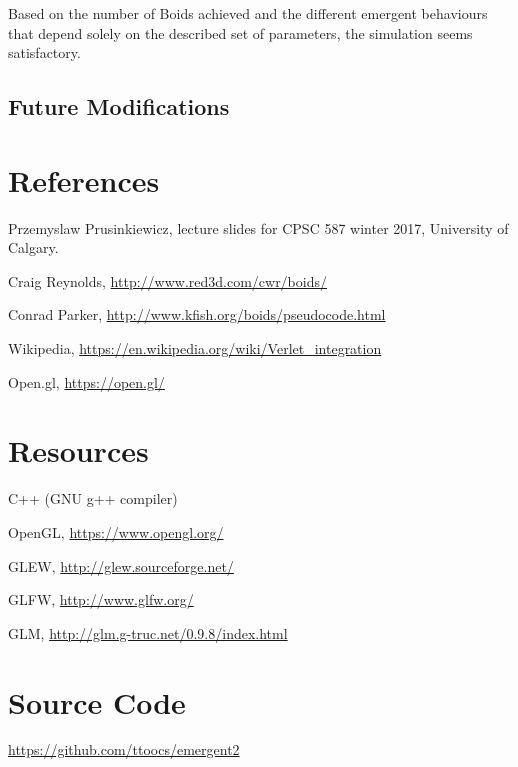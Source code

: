 \documentclass[12pt]{article}
\begin{document}
Based on the number of Boids achieved and the different emergent behaviours that depend solely on the described set of parameters, the simulation seems satisfactory.

\subsection*{Future Modifications}

\section*{References}

\begin{enumerate}[label={[\arabic*]}]
	\item Przemyslaw Prusinkiewicz, lecture slides for CPSC 587 winter 2017, University of Calgary.
	
	\item Craig Reynolds, \url{http://www.red3d.com/cwr/boids/}
	
	\item Conrad Parker, \url{http://www.kfish.org/boids/pseudocode.html}
	
	\item Wikipedia,  \url{https://en.wikipedia.org/wiki/Verlet_integration}
	
	\item Open.gl, \url{https://open.gl/}
\end{enumerate}

\section*{Resources}

\begin{enumerate}[label={[\arabic*]}]
	\item C++ (GNU g++ compiler)
	
	\item OpenGL, \url{https://www.opengl.org/}
	
	\item GLEW, \url{http://glew.sourceforge.net/}
	
	\item GLFW, \url{http://www.glfw.org/}
	
	\item GLM, \url{http://glm.g-truc.net/0.9.8/index.html}
\end{enumerate}

\section*{Source Code}
\url{https://github.com/ttoocs/emergent2}
\end{document}
